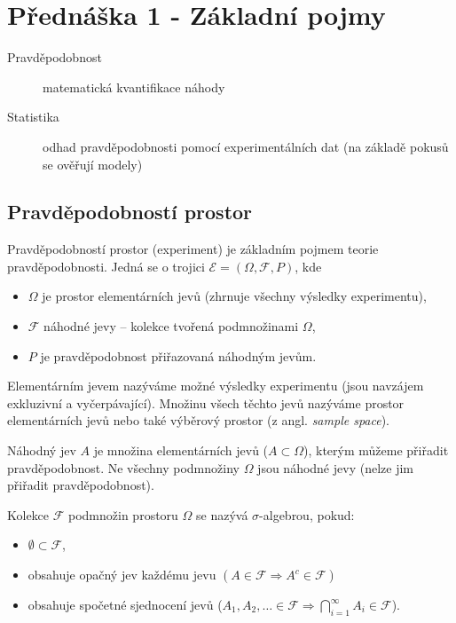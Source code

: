 \section{Přednáška 1 - Základní pojmy}

\begin{description}
    \item[Pravděpodobnost] matematická kvantifikace náhody
    \item[Statistika] odhad pravděpodobnosti pomocí experimentálních dat (na základě pokusů se ověřují modely) 
\end{description}

\subsection{Pravděpodobností prostor}

Pravděpodobností prostor (experiment) je základním pojmem teorie pravděpodobnosti.
Jedná se o trojici $\mathcal{E} = (\Omega, \mathcal{F}, P)$, kde

\begin{itemize}
    \item $\Omega$ je prostor elementárních jevů (zhrnuje všechny výsledky experimentu),
    \item $\mathcal{F}$ náhodné jevy -- kolekce tvořená podmnožinami $\Omega$,
    \item $P$ je pravděpodobnost přiřazovaná náhodným jevům.
\end{itemize}

Elementárním jevem nazýváme možné výsledky experimentu (jsou navzájem exkluzivní a vyčerpávající).
Množinu všech těchto jevů nazýváme prostor elementárních jevů nebo také výběrový prostor (z angl. \textit{sample space}).

Náhodný jev $A$ je množina elementárních jevů ($A \subset \Omega $), kterým můžeme přiřadit pravděpodobnost.
Ne všechny podmnožiny $\Omega$ jsou náhodné jevy (nelze jim přiřadit pravděpodobnost).

Kolekce $\mathcal{F}$ podmnožin prostoru $\Omega$ se nazývá $\sigma$-algebrou, pokud:

\begin{itemize}
    \item $\emptyset \subset \mathcal{F}$,
    \item obsahuje opačný jev každému jevu $(A \in \mathcal{F} \Rightarrow A^c \in \mathcal{F})$
    \item obsahuje spočetné sjednocení jevů ($A_1, A_2, \dots \in \mathcal{F} \Rightarrow \bigcap_{i=1}^{\infty}{A_i} \in \mathcal{F}$).
\end{itemize}

